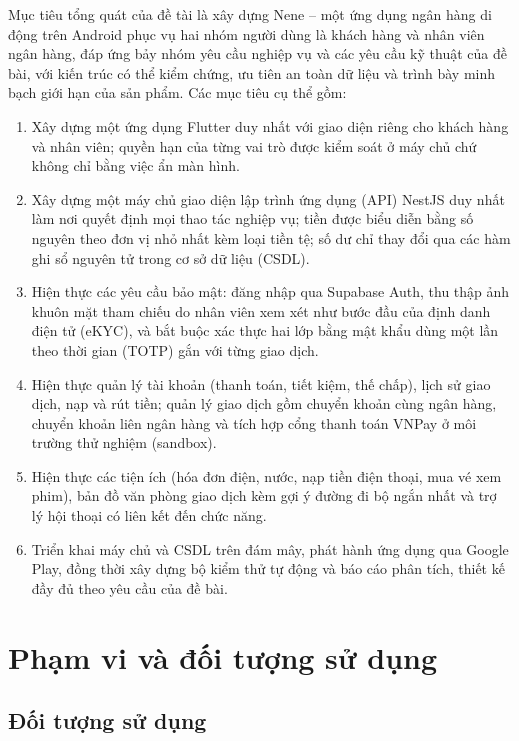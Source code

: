 Mục tiêu tổng quát của đề tài là xây dựng Nene -- một ứng dụng ngân hàng di động trên Android phục vụ hai nhóm người dùng là khách hàng và nhân viên ngân hàng, đáp ứng bảy nhóm yêu cầu nghiệp vụ và các yêu cầu kỹ thuật của đề bài, với kiến trúc có thể kiểm chứng, ưu tiên an toàn dữ liệu và trình bày minh bạch giới hạn của sản phẩm. Các mục tiêu cụ thể gồm:
\begin{enumerate}
	\item Xây dựng một ứng dụng Flutter duy nhất với giao diện riêng cho khách hàng và nhân viên; quyền hạn của từng vai trò được kiểm soát ở máy chủ chứ không chỉ bằng việc ẩn màn hình.
	\item Xây dựng một máy chủ giao diện lập trình ứng dụng (API) NestJS duy nhất làm nơi quyết định mọi thao tác nghiệp vụ; tiền được biểu diễn bằng số nguyên theo đơn vị nhỏ nhất kèm loại tiền tệ; số dư chỉ thay đổi qua các hàm ghi sổ nguyên tử trong cơ sở dữ liệu (CSDL).
	\item Hiện thực các yêu cầu bảo mật: đăng nhập qua Supabase Auth, thu thập ảnh khuôn mặt tham chiếu do nhân viên xem xét như bước đầu của định danh điện tử (eKYC), và bắt buộc xác thực hai lớp bằng mật khẩu dùng một lần theo thời gian (TOTP) gắn với từng giao dịch.
	\item Hiện thực quản lý tài khoản (thanh toán, tiết kiệm, thế chấp), lịch sử giao dịch, nạp và rút tiền; quản lý giao dịch gồm chuyển khoản cùng ngân hàng, chuyển khoản liên ngân hàng và tích hợp cổng thanh toán VNPay ở môi trường thử nghiệm (sandbox).
	\item Hiện thực các tiện ích (hóa đơn điện, nước, nạp tiền điện thoại, mua vé xem phim), bản đồ văn phòng giao dịch kèm gợi ý đường đi bộ ngắn nhất và trợ lý hội thoại có liên kết đến chức năng.
	\item Triển khai máy chủ và CSDL trên đám mây, phát hành ứng dụng qua Google Play, đồng thời xây dựng bộ kiểm thử tự động và báo cáo phân tích, thiết kế đầy đủ theo yêu cầu của đề bài.
\end{enumerate}

\section{Phạm vi và đối tượng sử dụng}
\label{sec:ch1-pham-vi}

\subsection{Đối tượng sử dụng}

